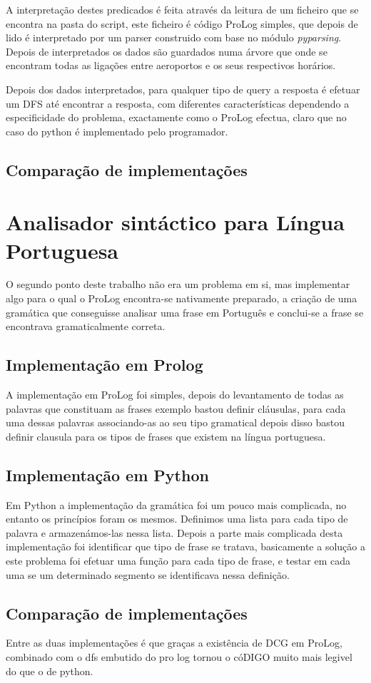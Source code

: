\documentclass[12pt,a4paper]{article}
\begin{document}
A interpretação destes predicados é feita através da leitura de um ficheiro que se encontra na pasta do script, este ficheiro é código ProLog simples, que depois de lido é interpretado por um parser construido com base no módulo \textit{pyparsing}. Depois de interpretados os dados são guardados numa árvore que onde se encontram todas as ligações entre aeroportos e os seus respectivos horários.

Depois dos dados interpretados, para qualquer tipo de query a resposta é efetuar um DFS até encontrar a resposta, com diferentes características dependendo a especificidade do problema, exactamente como o ProLog efectua, claro que no caso do python é implementado pelo programador.
\subsection{Comparação de implementações}
\section{Analisador sintáctico para Língua Portuguesa}
O segundo ponto deste trabalho não era um problema em si, mas implementar algo para o qual o ProLog encontra-se nativamente preparado, a criação de uma gramática que conseguisse analisar uma frase em Português e conclui-se a frase se encontrava gramaticalmente correta.
\subsection{Implementação em Prolog}
A implementação em ProLog foi simples, depois do levantamento de todas as palavras que constituam as frases exemplo bastou definir cláusulas, para cada uma dessas palavras associando-as ao seu tipo gramatical depois disso bastou definir clausula para os tipos de frases que existem na língua portuguesa.
\subsection{Implementação em Python}
Em Python a implementação da gramática foi um pouco mais complicada, no entanto os princípios foram os mesmos. Definimos uma lista para cada tipo de palavra e armazenámos-las nessa lista. Depois a parte mais complicada desta implementação foi identificar que tipo de frase se tratava, basicamente a solução a este problema foi efetuar uma função para cada tipo de frase, e testar em cada uma se um determinado segmento se identificava nessa definição. 
\subsection{Comparação de implementações}
Entre as duas implementações é que graças a existência de DCG em ProLog, combinado com o dfs embutido do pro log tornou o cóDIGO muito mais legivel do que o de python.
\end{document}
